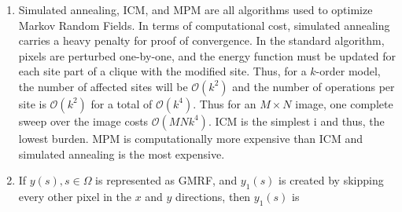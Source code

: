 \documentclass{article}
\begin{document}
\begin{enumerate}
\begin{eqnarray*}
\begin{array}{cccccccccccccc}
	\end{array}
	\right]
\end{eqnarray*}
Note that since the GMRF is defined on a discrete grid with toroidal boundary conditions, the model 
'wraps around' on the boundaries, and the matrix $B$ is block-circulant.\\
For the GMRF to be well posed, $B$ must be positive-definite. In order for this to be the case, the
eigenvalues $\lambda_s$ of $B$ must be positive:
\begin{eqnarray*}
	\lambda_s > 0, \forall s \in \Omega
\end{eqnarray*}
Where $\lambda_s$ are\cite{chellappa85}:
\begin{eqnarray*}
	\lambda_s &=& 1 - \sum_{r\in N(s)}\theta_1 cos \left( \frac{2\pi}{M}r_{y} + \frac{2\pi}{N}r_{x} \right)
\end{eqnarray*}
And in our simple case:
\begin{eqnarray*}
	\lambda_s &=& 1 - \theta_1 \left[
			cos \left( \frac{2\pi}{M}s_{y} + \frac{2\pi}{N}s_{x+1} \right) + 
	    	cos \left( \frac{2\pi}{M}s_{y} + \frac{2\pi}{N}s_{x-1} \right) 
		\right] + \\
		&&\theta_2 \left[
			cos \left( \frac{2\pi}{M}s_{y+1} + \frac{2\pi}{N}s_{x} \right) + 
	        cos \left( \frac{2\pi}{M}s_{y-1} + \frac{2\pi}{N}s_{x} \right)
		\right]
\end{eqnarray*}
\item Simulated annealing, ICM, and MPM are all algorithms used to optimize
	Markov Random Fields.  In terms of computational cost, simulated annealing
	carries a heavy penalty for proof of convergence.  In the standard algorithm,
	pixels are perturbed one-by-one, and the energy function must be updated for 
	each site part of a clique with the modified site.
	Thus, for a $k$-order model, the number of affected sites will be $\mathcal{O}(k^2)$ 
	and the number of operations per site is $\mathcal{O}(k^2)$ for a total of $\mathcal{O}(k^4)$.
	Thus for an $M\times N$ image, one complete sweep over the image costs $\mathcal{O}(MNk^4)$.
	ICM is the simplest i	
	and thus, the lowest burden.  MPM is computationally more expensive than ICM
	and simulated annealing is the most expensive.
\item If $y(s), s\in\Omega$ is represented as GMRF, and $y_1(s)$ is created by
	skipping every other pixel in the $x$ and $y$ directions, then $y_1(s)$ is

\end{enumerate}
\end{document}

